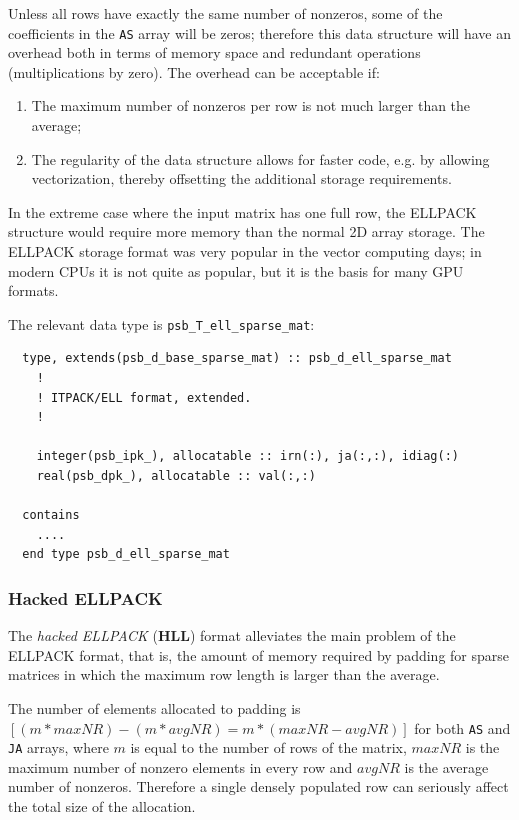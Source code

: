 Unless all rows have exactly the same number of nonzeros, some of the
coefficients in the \verb|AS| array will be zeros; therefore this
data structure will have  an overhead both in terms of memory space
and redundant operations (multiplications by zero).  The overhead can
be acceptable if: 
\begin{enumerate}
\item The maximum number of nonzeros per row is not much larger than
  the    average;
\item The regularity of the data structure allows for faster  code,
  e.g. by allowing vectorization, thereby offsetting the additional
  storage requirements.  
\end{enumerate}
In the extreme case where the input matrix has one full row, the
ELLPACK structure would require more memory than the normal 2D array
storage. The ELLPACK storage format was very popular in the vector
computing days; in modern CPUs it is not quite as popular, but it
is  the basis for many GPU formats. 

The relevant data type is \verb|psb_T_ell_sparse_mat|:
{\small
\begin{lstlisting}
  type, extends(psb_d_base_sparse_mat) :: psb_d_ell_sparse_mat
    !
    ! ITPACK/ELL format, extended.
    !     
    
    integer(psb_ipk_), allocatable :: irn(:), ja(:,:), idiag(:)
    real(psb_dpk_), allocatable :: val(:,:)

  contains
    ....
  end type psb_d_ell_sparse_mat
\end{lstlisting}
}


\subsubsection*{Hacked ELLPACK}

The \textit{hacked ELLPACK} (\textbf{HLL}) format 
alleviates the main problem of the ELLPACK format, that is, 
the  amount of  memory required by  padding for  sparse matrices in
which the maximum row length is  larger than the average.

The number of  elements  allocated to padding is $[(m*maxNR) -
(m*avgNR) = m*(maxNR-avgNR)]$ 
for both \verb|AS|  and \verb|JA| arrays,
where $m$ is equal to the number of rows of the matrix, $maxNR$ is the
maximum number of nonzero elements 
in every row and $avgNR$ is the average number of nonzeros. 
Therefore a single densely populated row can seriously affect the
total size of the allocation. 

